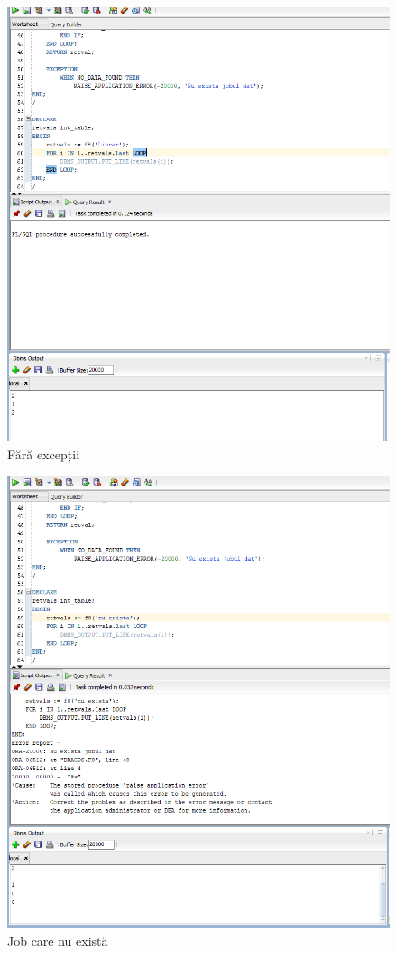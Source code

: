 \documentclass[12pt]{article}
\begin{document}
\begin{figure}[!htb]
\includegraphics[max width=\linewidth]{imgs/ex8_1.png}
\caption{Fără excepții}
\label{fig:ex8_1}
\end{figure}
\begin{figure}[!htb]
\includegraphics[max width=\linewidth]{imgs/ex8_2.png}
\caption{Job care nu există}
\label{fig:ex8_2}
\end{figure}
\end{document}
